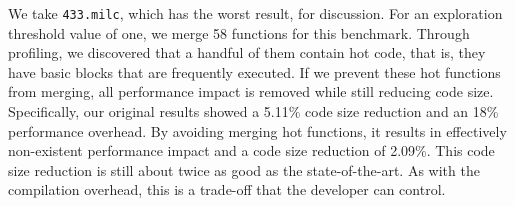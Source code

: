 We take \texttt{433.milc}, which has the worst result, for discussion. For an exploration threshold value of one, we merge 58 functions for this
benchmark. Through profiling, we discovered that a handful of them contain hot code, that is, they have basic blocks that are frequently executed. If we prevent these hot
functions from merging, all performance impact is removed while still reducing code size. Specifically, our original results showed a
5.11\% code size reduction and an 18\% performance overhead.
By avoiding merging hot functions, it results in effectively non-existent performance impact and
a code size reduction of 2.09\%.
This code size reduction is still about twice as good as the state-of-the-art. As with the
compilation overhead, this is a trade-off that the developer can control.






